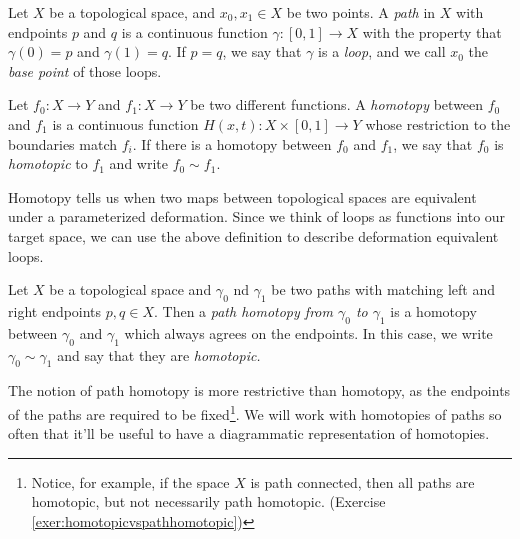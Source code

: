 \begin{doubledtuftepage}

\begin{definition} Let $X$ be a topological space,  and $x_0,  x_1\in X$ be two points. A \emph{path} in $X$ with endpoints $p$ and $q$ is a continuous function $\gamma: [0, 1]\to X$ with the property that $\gamma(0)=p$ and $\gamma(1)=q$. If $p=q$,  we say that $\gamma$ is a \emph{loop},  and we call $x_0$ the \emph{base point} of those loops. 
\end{definition}

\begin{definition}
	Let $f_0:X\to Y$ and $f_1: X\to Y$ be two different functions. A \emph{homotopy} between $f_0$ and $f_1$ is a continuous function $H(x,  t):X\times [0,1]\to Y$ whose restriction to the boundaries match $f_i$. 
	If there is a homotopy between $f_0$ and $f_1$,  we say that $f_0$ is \emph{homotopic} to $f_1$ and write $f_0\sim f_1$.
\end{definition}
Homotopy tells us when two maps between topological spaces are equivalent under a parameterized deformation. Since we think of loops as functions into our target space, we can use the above definition to describe deformation equivalent loops. 
\begin{definition}
	Let $X$ be a topological space  and $\gamma_0$ nd $\gamma_1$ be two paths with matching left and right endpoints  $p,  q\in X$.	 Then a \emph{path homotopy from $\gamma_0$ to $\gamma_1$} is a homotopy between $\gamma_0$ and $\gamma_1$ which always agrees on the endpoints. In this case, we write $\gamma_0\sim \gamma_1$ and say that they are \emph{homotopic.} 
\end{definition}
The notion of path homotopy is more restrictive than homotopy, as the endpoints of the paths are required to be fixed\footnote{Notice, for example, if the space $X$ is path connected, then all paths are homotopic, but not necessarily path homotopic. (Exercise \ref{exer:homotopicvspathhomotopic})}. We will work with homotopies of paths so often that it'll be useful to have a diagrammatic representation of homotopies. \smarginnote{\begin{tikzpicture}[scale=.85]

\end{tikzpicture}}
\end{doubledtuftepage}
